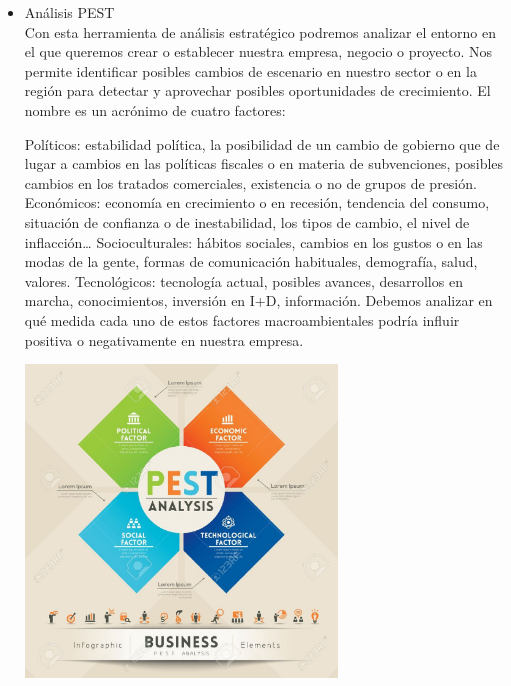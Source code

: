 \begin{itemize}
\item Análisis PEST
\\Con esta herramienta de análisis estratégico podremos analizar el entorno en el que queremos crear o establecer nuestra empresa, negocio o proyecto. Nos permite identificar posibles cambios de escenario en nuestro sector o en la región para detectar y aprovechar posibles oportunidades de crecimiento. El nombre es un acrónimo de cuatro factores:

Políticos: estabilidad política, la posibilidad de un cambio de gobierno que de lugar a cambios en las políticas fiscales o en materia de subvenciones, posibles cambios en los tratados comerciales, existencia o no de grupos de presión.
Económicos: economía en crecimiento o en recesión, tendencia del consumo, situación de confianza o de inestabilidad, los tipos de cambio, el nivel de inflacción…
Socioculturales: hábitos sociales, cambios en los gustos o en las modas de la gente, formas de comunicación habituales, demografía, salud, valores.
Tecnológicos: tecnología actual, posibles avances, desarrollos en marcha, conocimientos, inversión en I+D, información.
Debemos analizar en qué medida cada uno de estos factores macroambientales podría influir positiva o negativamente en nuestra empresa.  
		\begin{center}
		\includegraphics[width=8.3cm]{./Imagenes/Imagen1}
		\end{center}

	\end{itemize} 
	

